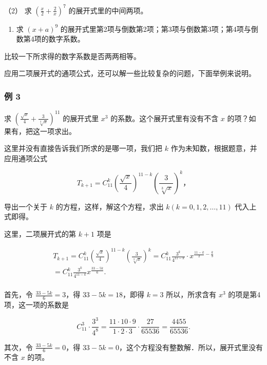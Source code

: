 （2） 求 \(\left(\frac{x}{2}+\frac{2}{x}\right)^{7}\)
的展开式里的中间两项。

\begin{enumerate}[start=3]
\item
  求 \((x+a)^{9}\)
  的展开式里第2项与倒数第2项；第3项与倒数第3项；第4项与倒数第4项的数字系数。
\end{enumerate}

比较一下所求得的数字系数是否两两相等。

应用二项展开式的通项公式，还可以解一些比较复杂的问题，下面举例来说明。

\subsubsection{例 3}

求 \(\left(\frac{\sqrt{x}}{4} + \frac{3}{\sqrt[3]{x}}\right)^{11}\)
的展开式里 \(x^3\) 的系数。这个展开式里有没有不含 \(x\)
的项？如果有，把这一项求出。

 这里并没有直接告诉我们所求的是哪一项，我们把 \(k\)
作为未知数，根据题意，并应用通项公式

\[
T _ {k + 1} = C _ {11} ^ {k} \left(\frac {\sqrt {x}}{4}\right) ^ {11 - k} \left(\frac {3}{\sqrt[3]{x}}\right) ^ {k}\text{，}
\]

导出一个关于 \(k\) 的方程，这样，解这个方程，求出
\(k(k = 0, 1, 2, \dots, 11)\) 代入上式即得。

 这里，二项展开式的第 \(k + 1\) 项是

\[
\begin{array}{l} T _ {k + 1} = C _ {11} ^ {k} \left(\frac {\sqrt {x}}{4}\right) ^ {11 - k} \left(\frac {3}{\sqrt[3]{x}}\right) ^ {k} = C _ {11} ^ {k} \frac {3 ^ {k}}{4 ^ {11 - k}} \cdot x ^ {\frac {11 - k}{2} - \frac {k}{3}} \\ = C _ {11} ^ {k} \frac {3 ^ {k}}{4 ^ {11 - k}} x ^ {\frac {33 - 5 k}{6}}. \\ \end{array}
\]

首先，令 \(\frac{33 - 5k}{6} = 3\)，得 \(33 - 5k = 18\)，即得 \(k = 3\)
所以，所求含有 \(x^3\) 的项是第4项，这一项的系数是

\[
C _ {11} ^ {3} \cdot \frac {3 ^ {3}}{4 ^ {8}} = \frac {11 \cdot 10 \cdot 9}{1 \cdot 2 \cdot 3} \cdot \frac {27}{65536} = \frac {4455}{65536}.
\]

其次，令 \(\frac{33 - 5k}{6} = 0\)，得
\(33 - 5k = 0\)，这个方程没有整数解．所以，展开式里没有不含 \(x\) 的项。

